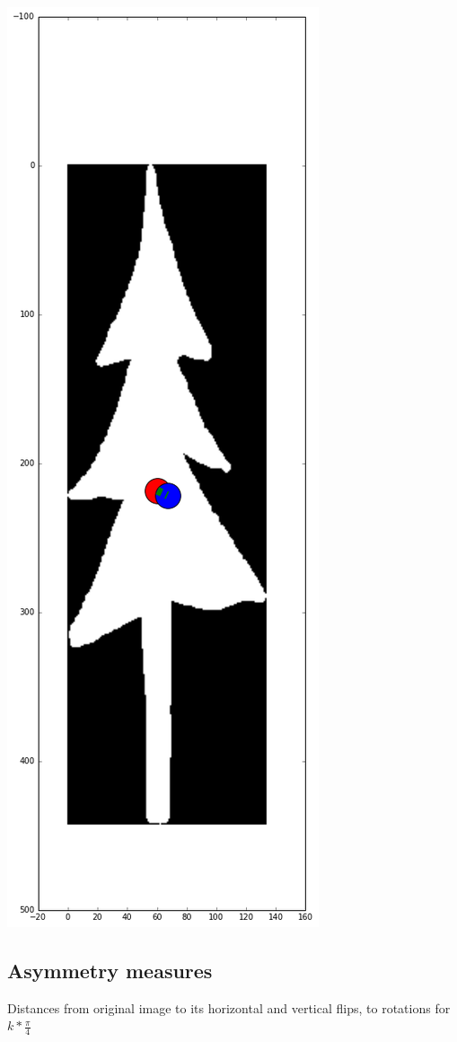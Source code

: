 \documentclass[12pt]{article}
\begin{document}
\includegraphics[scale=0.26]{tree_centroid.png}

\subsection{Asymmetry measures}
Distances from original image to its horizontal and vertical flips, to rotations for $k*\frac{\pi}{4}$
 
\end{document}
